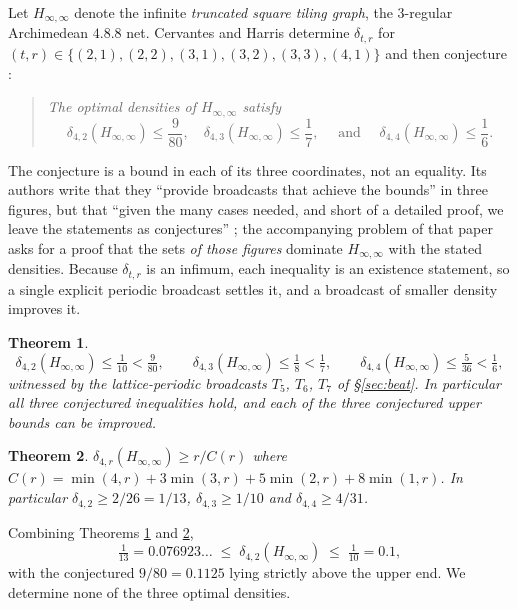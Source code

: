 \documentclass[11pt]{amsart}
\newtheorem{theorem}{Theorem}
\theoremstyle{definition}
\begin{document}
Let $H_{\infty,\infty}$ denote the infinite \emph{truncated square tiling graph}, the
$3$-regular Archimedean $4.8.8$ net. Cervantes and Harris determine $\delta_{t,r}$ for
$(t,r)\in\{(2,1),(2,2),(3,1),(3,2),(3,3),(4,1)\}$ and then conjecture \cite{CervantesHarris}:

\begin{quote}
\emph{The optimal densities of $H_{\infty,\infty}$ satisfy}
\[
  \delta_{4,2}(H_{\infty,\infty})\leq \frac{9}{80},\quad
  \delta_{4,3}(H_{\infty,\infty})\leq \frac{1}{7},\quad\text{ and }\quad
  \delta_{4,4}(H_{\infty,\infty})\leq \frac{1}{6}.
\]
\end{quote}

The conjecture is a bound in each of its three coordinates, not an equality. Its authors write
that they ``provide broadcasts that achieve the bounds'' in three figures, but that ``given the
many cases needed, and short of a detailed proof, we leave the statements as conjectures''
\cite{CervantesHarris}; the accompanying problem of that paper asks for a proof that the sets
\emph{of those figures} dominate $H_{\infty,\infty}$ with the stated densities. Because
$\delta_{t,r}$ is an infimum, each inequality is an existence statement, so a single explicit
periodic broadcast settles it, and a broadcast of smaller density improves it.

\begin{theorem}\label{thm:beat}
\[
  \delta_{4,2}(H_{\infty,\infty})\leq \tfrac{1}{10}<\tfrac{9}{80},\qquad
  \delta_{4,3}(H_{\infty,\infty})\leq \tfrac{1}{8}<\tfrac{1}{7},\qquad
  \delta_{4,4}(H_{\infty,\infty})\leq \tfrac{5}{36}<\tfrac{1}{6},
\]
witnessed by the lattice-periodic broadcasts $T_5$, $T_6$, $T_7$ of \S\ref{sec:beat}. In
particular all three conjectured inequalities hold, and each of the three conjectured upper
bounds can be improved.
\end{theorem}

\begin{theorem}\label{thm:lower}
$\delta_{4,r}(H_{\infty,\infty})\geq r/C(r)$ where
$C(r)=\min(4,r)+3\min(3,r)+5\min(2,r)+8\min(1,r)$. In particular
$\delta_{4,2}\geq 2/26=1/13$, $\delta_{4,3}\geq 1/10$ and $\delta_{4,4}\geq 4/31$.
\end{theorem}

Combining Theorems \ref{thm:beat} and \ref{thm:lower},
\[
  \tfrac{1}{13}=0.076923\ldots\;\leq\;\delta_{4,2}(H_{\infty,\infty})\;\leq\;\tfrac{1}{10}=0.1,
\]
with the conjectured $9/80=0.1125$ lying strictly above the upper end. We determine none of the
three optimal densities.
\end{document}
